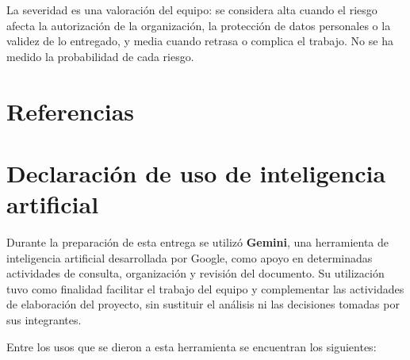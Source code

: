 \documentclass[11pt,a4paper]{article}
\begin{document}
La severidad es una valoración del equipo: se considera alta cuando el riesgo afecta la autorización de la organización, la protección de datos personales o la validez de lo entregado, y media cuando retrasa o complica el trabajo. No se ha medido la probabilidad de cada riesgo.

\section{Referencias}

\printbibliography[heading=none]

\section{Declaración de uso de inteligencia artificial}

Durante la preparación de esta entrega se utilizó \textbf{Gemini}, una herramienta de inteligencia artificial desarrollada por Google, como apoyo en determinadas actividades de consulta, organización y revisión del documento. Su utilización tuvo como finalidad facilitar el trabajo del equipo y complementar las actividades de elaboración del proyecto, sin sustituir el análisis ni las decisiones tomadas por sus integrantes.

Entre los usos que se dieron a esta herramienta se encuentran los siguientes:
\end{document}
